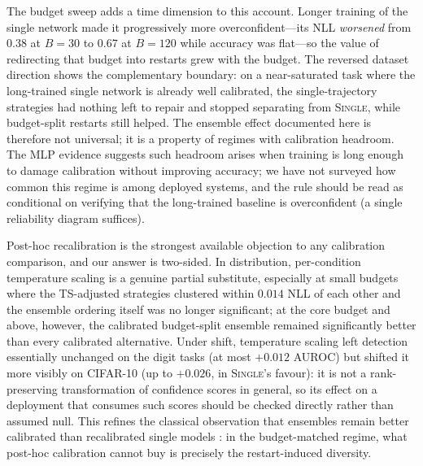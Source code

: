 \documentclass[11pt,a4paper]{article}
\newcommand{\single}{\textsc{Single}}
\newcommand{\ts}{\textsc{TS}}
\begin{document}
The budget sweep adds a time dimension to this account. Longer training of
the single network made it progressively more overconfident---its NLL
\emph{worsened} from $0.38$ at $B=30$ to $0.67$ at $B=120$ while accuracy
was flat---so the value of redirecting that budget into restarts grew
with the budget. The reversed dataset direction shows the complementary
boundary: on a near-saturated task where the long-trained single network
is already well calibrated, the single-trajectory strategies had nothing
left to repair and stopped separating from \single{}, while budget-split
restarts still helped. The ensemble effect documented here is therefore
not universal; it is a property of regimes with calibration headroom. The
MLP evidence suggests such headroom arises when training is long enough
to damage calibration without improving accuracy; we have not surveyed how
common this regime is among deployed systems, and the rule should be read
as conditional on verifying that the long-trained baseline is overconfident
(a single reliability diagram suffices).

Post-hoc recalibration is the strongest available objection to any
calibration comparison, and our answer is two-sided. In distribution,
per-condition temperature scaling is a genuine partial substitute,
especially at small budgets where the \ts-adjusted strategies clustered
within $0.014$ NLL of each other and the ensemble ordering itself was no
longer significant; at the core budget and above, however, the
calibrated budget-split ensemble remained significantly better than
every calibrated alternative. Under shift, temperature scaling left
detection essentially unchanged on the digit tasks (at most $+0.012$
AUROC) but shifted it more visibly on CIFAR-10 (up to $+0.026$, in
\single{}'s favour): it is not a rank-preserving transformation of
confidence scores in general, so its effect on a deployment that
consumes such scores should be checked directly rather than assumed null.
This refines the classical observation that ensembles remain
better calibrated than recalibrated single models
\citep{lakshminarayanan2017,guo2017,zhang2020}: in the budget-matched
regime, what post-hoc calibration cannot buy is precisely the
restart-induced diversity.
\end{document}
